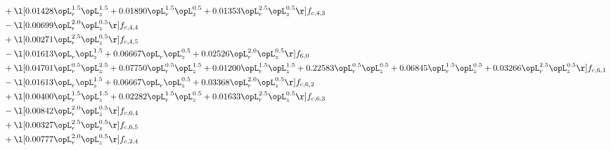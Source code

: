 \begin{alignat}{2}
& + \l[  0.01428 \opL_r^{1.5} \opL_z^{1.5} +  0.01890 \opL_r^{1.5} \opL_z^{0.5} +  0.01353 \opL_r^{2.5} \opL_z^{0.5}  \r] f_{c,4,3} \nonumber \\ 
& - \l[  0.00699 \opL_r^{2.0} \opL_z^{0.5}  \r] f_{c,4,4} \nonumber \\ 
& + \l[  0.00271 \opL_r^{2.5} \opL_z^{0.5}  \r] f_{c,4,5} \nonumber \\ 
& - \l[  0.01613 \opL_r \opL_z^{1.5} +  0.06667 \opL_r \opL_z^{0.5} +  0.02526 \opL_r^{2.0} \opL_z^{0.5}  \r] f_{6,0} \nonumber \\ 
& + \l[  0.04701 \opL_r^{0.5} \opL_z^{2.5} +  0.07750 \opL_r^{0.5} \opL_z^{1.5} +  0.01200 \opL_r^{1.5} \opL_z^{1.5} +  0.22583 \opL_r^{0.5} \opL_z^{0.5} +  0.06845 \opL_r^{1.5} \opL_z^{0.5} +  0.03266 \opL_r^{2.5} \opL_z^{0.5}  \r] f_{c,6,1} \nonumber \\ 
& - \l[  0.01613 \opL_r \opL_z^{1.5} +  0.06667 \opL_r \opL_z^{0.5} +  0.03368 \opL_r^{2.0} \opL_z^{0.5}  \r] f_{c,6,2} \nonumber \\ 
& + \l[  0.00400 \opL_r^{1.5} \opL_z^{1.5} +  0.02282 \opL_r^{1.5} \opL_z^{0.5} +  0.01633 \opL_r^{2.5} \opL_z^{0.5}  \r] f_{c,6,3} \nonumber \\ 
& - \l[  0.00842 \opL_r^{2.0} \opL_z^{0.5}  \r] f_{c,6,4} \nonumber \\ 
& + \l[  0.00327 \opL_r^{2.5} \opL_z^{0.5}  \r] f_{c,6,5} \nonumber \\ 
& + \l[  0.00777 \opL_r^{2.0} \opL_z^{0.5}  \r] f_{c,2,4} \nonumber \\ 
\end{alignat} 


